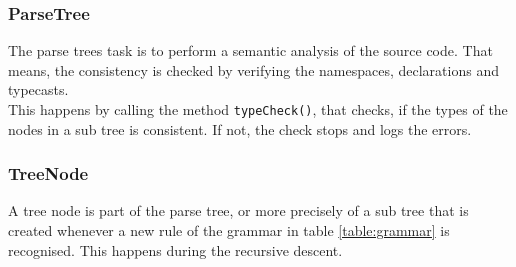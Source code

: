 \subsubsection{ParseTree}
The parse trees task is to perform a semantic analysis of the source code. That means, the consistency is checked by verifying the namespaces, declarations and typecasts.\\
This happens by calling the method \texttt{typeCheck()}, that checks, if the types of the nodes in a sub tree is consistent. If not, the check stops and logs the errors.\\

\subsubsection{TreeNode}
A tree node is part of the parse tree, or more precisely of a sub tree that is created whenever a new rule of the grammar in table \ref{table:grammar} is recognised. This happens during the recursive descent.